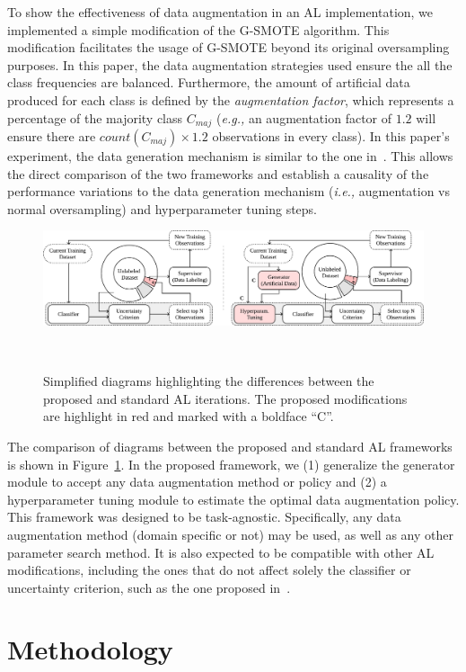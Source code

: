 \documentclass[preprint, 12pt]{elsarticle}
\begin{document}
To show the effectiveness of data augmentation in an AL implementation, we
implemented a simple modification of the G-SMOTE algorithm. This modification
facilitates the usage of G-SMOTE beyond its original oversampling purposes. In
this paper, the data augmentation strategies used ensure the all the class
frequencies are balanced. Furthermore, the amount of artificial data produced
for each class is defined by the \textit{augmentation factor}, which
represents a percentage of the majority class $C_{maj}$ (\textit{e.g.,} an
augmentation factor of $1.2$ will ensure there are $count(C_{maj}) \times 1.2$
observations in every class). In this paper's experiment, the data generation
mechanism is similar to the one in~\cite{Fonseca2021}. This allows the direct
comparison of the two frameworks and establish a causality of the performance
variations to the data generation mechanism (\textit{i.e.,} augmentation vs
normal oversampling) and hyperparameter tuning steps.

\begin{figure}[H]
	\centering
	\includegraphics[width=\linewidth]{../analysis/al_comparison}
    \caption{%
        Simplified diagrams highlighting the differences between the proposed
        and standard AL iterations. The proposed modifications are highlight
        in red and marked with a boldface ``C''.
    }~\label{fig:al_comparison}
\end{figure}

The comparison of diagrams between the proposed and standard AL frameworks is
shown in Figure~\ref{fig:al_comparison}. In the proposed framework, we (1)
generalize the generator module to accept any data augmentation method or
policy and (2) a hyperparameter tuning module to estimate the optimal data
augmentation policy. This framework was designed to be task-agnostic.
Specifically, any data augmentation method (domain specific or not) may be
used, as well as any other parameter search method. It is also expected to be
compatible with other AL modifications, including the ones that do not affect
solely the classifier or uncertainty criterion, such as the one proposed
in~\cite{Yoo2019}.
 
\section{Methodology}~\label{sec:methodology}
\end{document}
